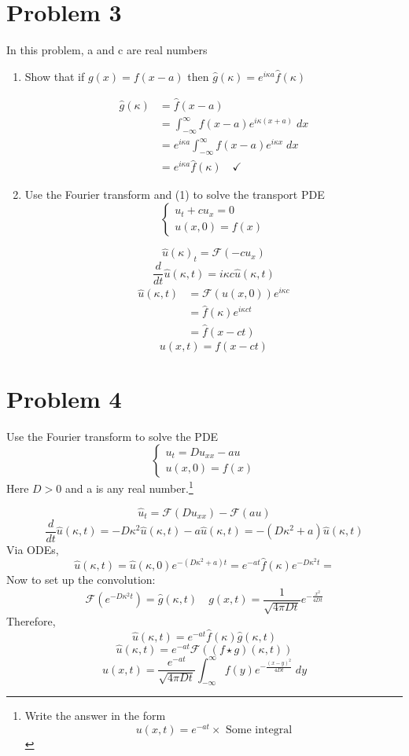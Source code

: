 \documentclass[12pt]{article}
\renewcommand{\hat}[1]{\widehat{#1}}
\newcommand{\F}[1]{\mathcal{F}(#1)}
\begin{document}
\pagebreak
\color{black}
\section*{Problem 3}
In this problem, a and c are real numbers
\begin{enumerate}
    \color{black}
    \item Show that if $g(x) = f(x - a)$ then $\hat{g}(\kappa) = e^{i\kappa a}\hat{f}(\kappa)$
    
    \color{blue}
    \begin{align*}
        \hat{g}(\kappa) &= \hat{f}(x - a)\\
        &= \int_{-\infty}^\infty f(x - a) e^{i\kappa(x + a)}\; dx\\
        &= e^{i\kappa a}\int_{-\infty}^\infty f(x - a) e^{i\kappa x}\; dx\\
        &= e^{i\kappa a}\hat{f}(\kappa) \quad \checkmark
    \end{align*}
    \color{black}
    \item Use the Fourier transform and (1) to solve the transport PDE
    \[\begin{cases}
        u_t + cu_x = 0\\
        u(x, 0) = f(x)
    \end{cases}\]

    \color{blue}
    \[\hat{u}(\kappa)_t = \F{-cu_x}\]
    \[\frac{d}{dt}\hat{u}(\kappa, t) = i\kappa c\hat{u}(\kappa, t)\]
    \begin{align*}
        \hat{u}(\kappa, t) &= \F{u(x, 0)} e^{i\kappa c}\\
        &= \hat{f}(\kappa)e^{i\kappa ct}\\ 
        &= \hat{f}(x - ct)
    \end{align*}
    \[\boxed{u(x, t) = f(x - ct)}\]
\end{enumerate}

\pagebreak
\section*{Problem 4}
Use the Fourier transform to solve the PDE
\[\begin{cases}
    u_t = Du_{xx} - au\\
    u(x, 0) = f(x)
\end{cases}\]
Here $D > 0$ and a is any real number.\footnote{Write the answer in the form
\[u(x, t) = e^{-at} \times \text{ Some integral}\]}

\color{blue}
\[\hat{u}_t = \F{Du_{xx}} - \F{au}\]
\[\frac{d}{dt}\hat{u}(\kappa, t) = -D\kappa^2\hat{u}(\kappa, t) - a\hat{u}(\kappa, t) = -(D\kappa^2 + a)\hat{u}(\kappa, t)\]
Via ODEs, 
\[\hat{u}(\kappa, t) = \hat{u}(\kappa, 0)e^{-(D\kappa^2 + a)t} = e^{-at} \hat{f}(\kappa) e^{-D\kappa^2t} = \]
Now to set up the convolution:
\[\F{e^{-D\kappa^2t}} = \hat{g}(\kappa, t) \quad g(x, t) = \frac{1}{\sqrt{4\pi Dt}}e^{-\frac{x^2}{4Dt}}\]
Therefore, 
\[\hat{u}(\kappa, t) = e^{-at} \hat{f}(\kappa) \hat{g}(\kappa, t)\]
\[\hat{u}(\kappa, t) = e^{-at}\F{(f \star g)(\kappa, t)}\]
\[\boxed{u(x, t) = \frac{e^{-at}}{\sqrt{4\pi Dt}}\int_{-\infty}^\infty f(y) e^{-\frac{(x-y)^2}{4Dt}}\; dy}\]
\end{document}
